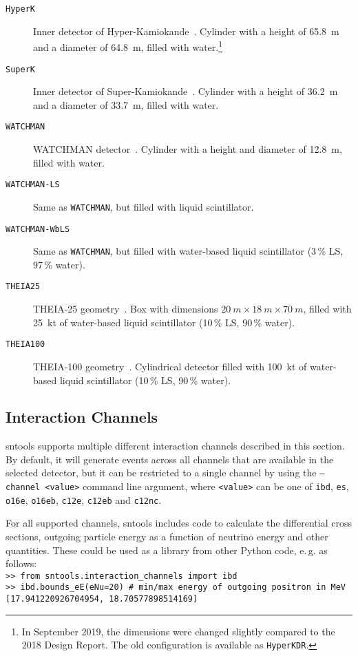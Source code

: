 \documentclass[11pt, oneside]{article}
\begin{document}
\begin{description}
\item[\texttt{HyperK}] Inner detector of Hyper-Kamiokande~\cite{HKDR2018}. Cylinder with a height of \SI{65.8}{m} and a diameter of \SI{64.8}{m}, filled with water.\footnote{In September 2019, the dimensions were changed slightly compared to the 2018 Design Report. The old configuration is available as \texttt{HyperKDR}.}
\item[\texttt{SuperK}] Inner detector of Super-Kamiokande~\cite{Fukuda2003}. Cylinder with a height of \SI{36.2}{m} and a diameter of \SI{33.7}{m}, filled with water.
\item[\texttt{WATCHMAN}] WATCHMAN detector~\cite{Askins2015}. Cylinder with a height and diameter of \SI{12.8}{m}, filled with water.
\item[\texttt{WATCHMAN-LS}] Same as \texttt{WATCHMAN}, but filled with liquid scintillator.
\item[\texttt{WATCHMAN-WbLS}] Same as \texttt{WATCHMAN}, but filled with water-based liquid scintillator (3\,\% LS, 97\,\% water).
\item[\texttt{THEIA25}] THEIA-25 geometry~\cite{Askins2020}. Box with dimensions $\SI{20}{m}\times\SI{18}{m}\times\SI{70}{m}$, filled with \SI{25}{kt} of water-based liquid scintillator (10\,\% LS, 90\,\% water).
\item[\texttt{THEIA100}] THEIA-100 geometry~\cite{Askins2020}. Cylindrical detector filled with \SI{100}{kt} of water-based liquid scintillator (10\,\% LS, 90\,\% water).
\end{description}


\subsection{Interaction Channels} \label{sec:interaction-channels}
sntools supports multiple different interaction channels described in this section.
By default, it will generate events across all channels that are available in the selected detector, but it can be restricted to a single channel by using the \texttt{--channel <value>} command line argument, where \texttt{<value>} can be one of \texttt{ibd}, \texttt{es}, \texttt{o16e}, \texttt{o16eb}, \texttt{c12e}, \texttt{c12eb} and \texttt{c12nc}.

For all supported channels, sntools includes code to calculate the differential cross sections, outgoing particle energy as a function of neutrino energy and other quantities.
These could be used as a library from other Python code, e.\,g. as follows:\\
\texttt{>> from sntools.interaction\_channels import ibd}\\
\texttt{>> ibd.bounds\_eE(eNu=20)  \# min/max energy of outgoing positron in MeV}\\
\texttt{[17.941220926704954, 18.70577898514169]}
\end{document}
